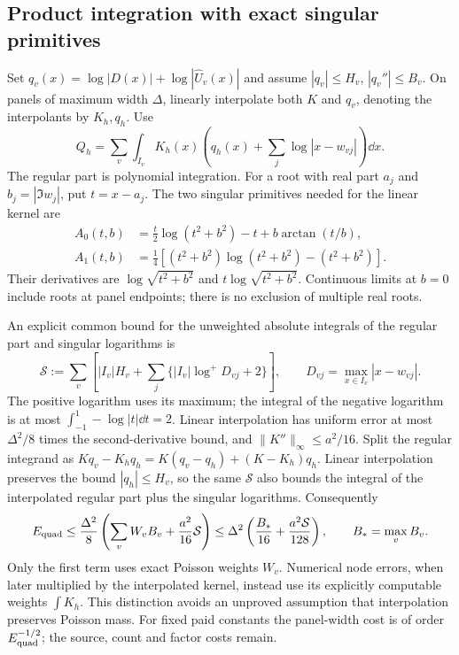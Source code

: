 \subsection{Product integration with exact singular primitives}
Set \(q_v(x)=\log|D(x)|+\log|\widehat U_v(x)|\) and assume
\(|q_v|\le H_v\), \(|q_v''|\le B_v\). On panels of maximum width
\(\Delta\), linearly interpolate both \(K\) and \(q_v\), denoting
the interpolants by \(K_h,q_h\). Use
\begin{equation}\label{eq:product-integration}
 Q_h=\sum_v\int_{I_v}K_h(x)
       \left(q_h(x)+\sum_j\log|x-w_{vj}|\right)\dd x.
\end{equation}
The regular part is polynomial integration. For a root with real part
\(a_j\) and \(b_j=|\Im w_j|\), put \(t=x-a_j\). The two singular
primitives needed for the linear kernel are
\begin{align}
 A_0(t,b)&=\tfrac t2\log(t^2+b^2)-t+b\arctan(t/b),\nonumber\\
 A_1(t,b)&=\tfrac14[(t^2+b^2)\log(t^2+b^2)-(t^2+b^2)].
 \label{eq:root-primitives}
\end{align}
Their derivatives are \(\log\sqrt{t^2+b^2}\) and
\(t\log\sqrt{t^2+b^2}\). Continuous limits at \(b=0\) include roots
at panel endpoints; there is no exclusion of multiple real roots.

An explicit common bound for the unweighted absolute integrals of the
regular part and singular logarithms is
\[
 \mathcal S:=\sum_v\left[|I_v|H_v+
       \sum_j\{|I_v|\log^+D_{vj}+2\}\right],\qquad
 D_{vj}=\max_{x\in I_v}|x-w_{vj}|.
\]
The positive logarithm uses its maximum; the integral of the negative
logarithm is at most \(\int_{-1}^1-\log|t|\dd t=2\).
Linear interpolation has uniform error at most \(\Delta^2/8\) times
the second-derivative bound, and \(\|K''\|_\infty\le a^2/16\).
Split the regular integrand as
\(Kq_v-K_hq_h=K(q_v-q_h)+(K-K_h)q_h\).
Linear interpolation preserves the bound \(|q_h|\le H_v\), so the same
\(\mathcal S\) also bounds the integral of the interpolated regular
part plus the singular logarithms. Consequently
\begin{equation}\label{eq:product-error-safe}
 E_{\rm quad}\le\frac{\Delta^2}{8}
       \left(\sum_v W_v B_v+\frac{a^2}{16}\mathcal S\right)
 \le\Delta^2\left(\frac{B_*}{16}+\frac{a^2\mathcal S}{128}\right),
 \qquad B_*=\max_v B_v.
\end{equation}
Only the first term uses exact Poisson weights \(W_v\). Numerical
node errors, when later multiplied by the interpolated kernel, instead
use its explicitly computable weights \(\int K_h\). This distinction
avoids an unproved assumption that interpolation preserves Poisson mass.
For fixed paid constants the panel-width cost is of order
\(E_{\rm quad}^{-1/2}\); the source, count and factor costs remain.

